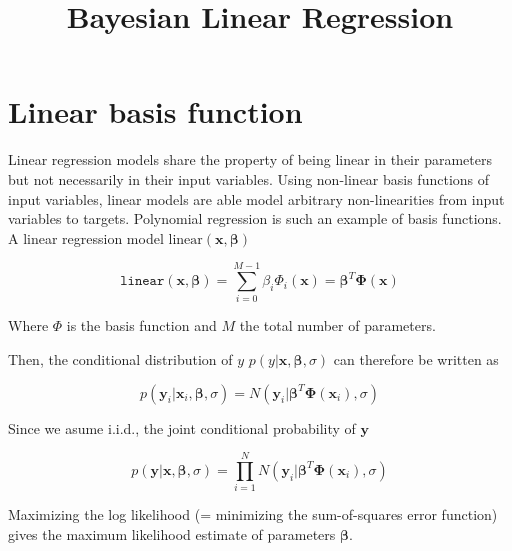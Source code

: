 \documentclass[a4paper,10pt]{article}
\title{Bayesian Linear Regression}
\author{}
\begin{document}
\maketitle

\begin{abstract}

\end{abstract}

\section{Linear basis function }

Linear regression models share the property of being linear in their parameters but not necessarily in their input variables. 
Using non-linear basis functions of input variables, linear models are able model arbitrary non-linearities from input variables to targets.  
Polynomial regression is such an example of basis functions.
A linear regression model $\text{linear}(\bm{x},\bm{\beta})$

\begin{equation}
\texttt{linear}(\bm{x},\bm{\beta}) = \sum_{i=0}^{M-1} \beta_i \Phi_i(\bm{x}) = \bm{\beta}^T \bm{\Phi}(\bm{x})
\end{equation}

Where $\Phi$ is the basis function and $M$ the total number of parameters.

Then, the conditional distribution of $y$ $p(y | \bm{x}, \bm{\beta}, \sigma)$ can therefore be written as

\begin{equation}
p(\bm{y}_i | \bm{x}_i, \bm{\beta}, \sigma) = N(\bm{y}_i | \bm{\beta}^T \bm{\Phi}(\bm{x}_i) , \sigma)
\end{equation}

Since we asume i.i.d., the joint conditional probability of $\bm{y}$

\begin{equation}
p(\bm{y} | \bm{x}, \bm{\beta}, \sigma) = \prod_{i=1}^{N} N(\bm{y}_i | \bm{\beta}^T \bm{\Phi}(\bm{x}_i), \sigma)
\end{equation}

Maximizing the log likelihood (= minimizing the sum-of-squares error function) gives the maximum likelihood estimate of parameters $\bm{\beta}$.
\end{document}
